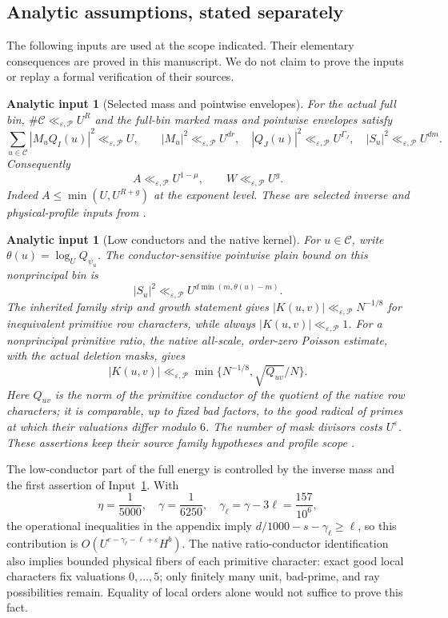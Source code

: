 \documentclass[11pt]{article}
\newtheorem{analyticinput}[theorem]{Analytic input}
\theoremstyle{definition}
\newcommand{\eps}{\varepsilon}
\newcommand{\lls}{\ll_{\eps,\mathcal P}}
\begin{document}
\subsection{Analytic assumptions, stated separately}
The following inputs are used at the scope indicated. Their elementary consequences are proved in this manuscript. We do not claim to prove the inputs or replay a formal verification of their sources.

\begin{analyticinput}[Selected mass and pointwise envelopes]\label{in-mass}
For the actual full bin, $\#\mathcal C\lls U^R$ and the full-bin marked mass and pointwise envelopes satisfy
\[
 \sum_{u\in\mathcal C}|M_uQ_I(u)|^2\lls U,
 \qquad |M_u|^2\lls U^{dr},\quad
 |Q_J(u)|^2\lls U^{\Gamma_J},\quad |S_u|^2\lls U^{dm}.
\]
Consequently
\begin{equation}\label{eq-AW}
 A\lls U^{1-\mu},\qquad W\lls U^g.
\end{equation}
Indeed $A\le\min(U,U^{R+g})$ at the exponent level. These are selected inverse and physical-profile inputs from \cite{amplification,n1,n2}.
\end{analyticinput}

\begin{analyticinput}[Low conductors and the native kernel]\label{in-kernel}
For $u\in\mathcal C$, write $\theta(u)=\log_U Q_{\psi_u}$. The conductor-sensitive pointwise plain bound on this nonprincipal bin is
\[
 |S_u|^2\lls U^{d\min(m,\theta(u)-m)}.
\]
The inherited family strip and growth statement gives $|K(u,v)|\lls N^{-1/8}$ for inequivalent primitive row characters, while always $|K(u,v)|\lls1$. For a nonprincipal primitive ratio, the native all-scale, order-zero Poisson estimate, with the actual deletion masks, gives
\begin{equation}\label{eq-hybrid-kernel}
 |K(u,v)|\lls\min\{N^{-1/8},\sqrt{Q_{uv}}/N\}.
\end{equation}
Here $Q_{uv}$ is the norm of the primitive conductor of the quotient of the native row characters; it is comparable, up to fixed bad factors, to the good radical of primes at which their valuations differ modulo $6$. The number of mask divisors costs $U^\eps$. These assertions keep their source family hypotheses and profile scope \cite{n1,n4}.
\end{analyticinput}

The low-conductor part of the full energy is controlled by the inverse mass and the first assertion of Input~\ref{in-kernel}. With
\[
 \eta=\frac1{5000},\quad \gamma=\frac1{6250},\quad
 \gamma_\ell=\gamma-3\ell=\frac{157}{10^6},
\]
the operational inequalities in the appendix imply $d/1000-s-\gamma_\ell\ge\ell$, so this contribution is $O(U^{e-\gamma_\ell-\ell+\eps}H^b)$. The native ratio-conductor identification also implies bounded physical fibers of each primitive character: exact good local characters fix valuations $0,\ldots,5$; only finitely many unit, bad-prime, and ray possibilities remain. Equality of local orders alone would not suffice to prove this fact.
\end{document}

